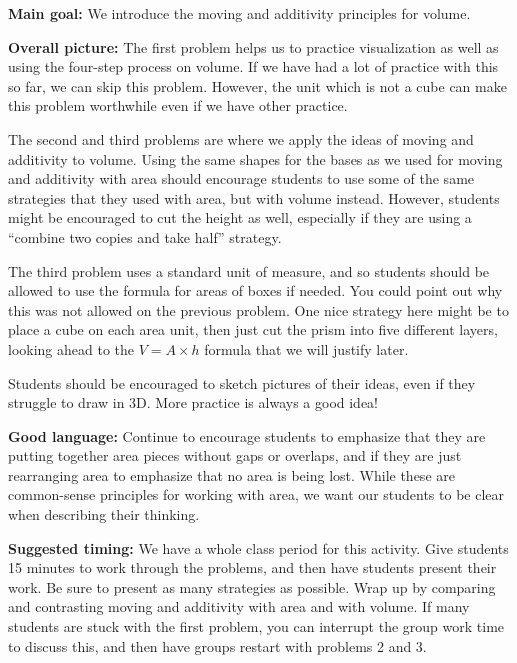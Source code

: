 \documentclass[noauthor,nooutcomes, handout]{ximera}
\begin{document}
\begin{instructorNotes}
{\bf Main goal:} We introduce the moving and additivity principles for volume.

{\bf Overall picture:} 
The first problem helps us to practice visualization as well as using the four-step process on volume. If we have had a lot of practice with this so far, we can skip this problem. However, the unit which is not a cube can make this problem worthwhile even if we have other practice.

The second and third problems are where we apply the ideas of moving and additivity to volume. Using the same shapes for the bases as we used for moving and additivity with area should encourage students to use some of the same strategies that they used with area, but with volume instead. However, students might be encouraged to cut the height as well, especially if they are using a ``combine two copies and take half'' strategy.

The third problem uses a standard unit of measure, and so students should be allowed to use the formula for areas of boxes if needed. You could point out why this was not allowed on the previous problem. One nice strategy here might be to place a cube on each area unit, then just cut the prism into five different layers, looking ahead to the $V = A \times h$ formula that we will justify later.

Students should be encouraged to sketch pictures of their ideas, even if they struggle to draw in 3D. More practice is always a good idea!



{\bf Good language:} Continue to encourage students to emphasize that they are putting together area pieces without gaps or overlaps, and if they are just rearranging area to emphasize that no area is being lost. While these are common-sense principles for working with area, we want our students to be clear when describing their thinking.



{\bf Suggested timing:} We have a whole class period for this activity. Give students 15 minutes to work through the problems, and then have students present their work. Be sure to present as many strategies as possible. Wrap up by comparing and contrasting moving and additivity with area and with volume. If many students are stuck with the first problem, you can interrupt the group work time to discuss this, and then have groups restart with problems 2 and 3.
\end{instructorNotes}
\end{document}
